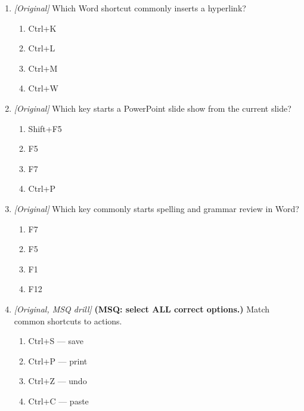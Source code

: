 \begin{enumerate}[label=\textbf{Q\arabic*.}, leftmargin=*]
\item \textit{[Original]} Which Word shortcut commonly inserts a hyperlink?
  \begin{enumerate}[label=\Alph*.]
\item Ctrl+K
   \item Ctrl+L
   \item Ctrl+M
   \item Ctrl+W
  \end{enumerate}

\item \textit{[Original]} Which key starts a PowerPoint slide show from the current slide?
  \begin{enumerate}[label=\Alph*.]
\item Shift+F5
   \item F5
   \item F7
   \item Ctrl+P
  \end{enumerate}

\item \textit{[Original]} Which key commonly starts spelling and grammar review in Word?
  \begin{enumerate}[label=\Alph*.]
\item F7
   \item F5
   \item F1
   \item F12
  \end{enumerate}

\item \textit{[Original, MSQ drill]} \textbf{(MSQ: select ALL correct options.)} Match common shortcuts to actions.
  \begin{enumerate}[label=\Alph*.]
\item Ctrl+S --- save
   \item Ctrl+P --- print
   \item Ctrl+Z --- undo
   \item Ctrl+C --- paste
  \end{enumerate}

\end{enumerate}
